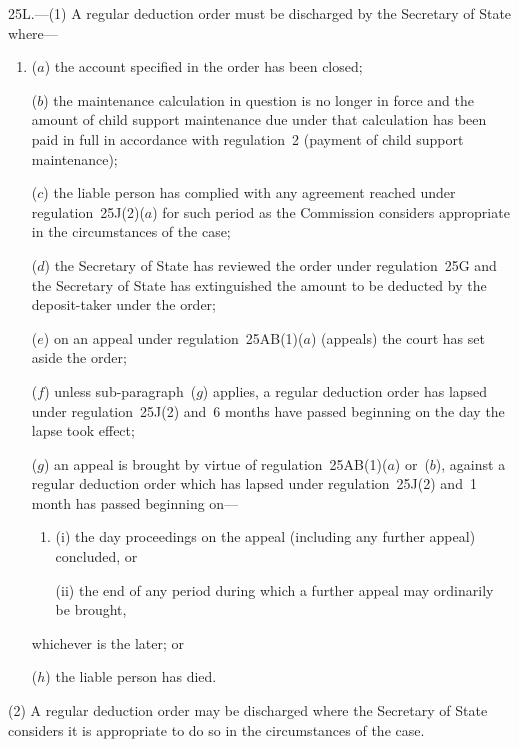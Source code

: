 \documentclass[12pt,a4paper]{article}
\begin{document}
25L.---(1)  A regular deduction order must be discharged by the 
Secretary of State  %
where—
\begin{enumerate}\item[]
($a$) the account specified in the order has been closed;

($b$) the maintenance calculation in question is no longer in force and the amount of child support maintenance due under that calculation has been paid in full in accordance with regulation~2 (payment of child support maintenance);

($c$) the liable person has complied with any agreement reached under regulation~25J(2)($a$)  for such period as the Commission considers appropriate in the circumstances of the case;

($d$) the 
Secretary of State  %
has reviewed the order under regulation~25G and 
the Secretary of State  %
has extinguished the amount to be deducted by the deposit-taker under the order;

($e$) on an appeal under regulation~25AB(1)($a$)  (appeals) the court has set aside the order;

($f$) unless sub-paragraph~($g$)  applies, a regular deduction order has lapsed under regulation~25J(2) and~6 months have passed beginning on the day the lapse took effect;

\begin{sloppypar}
($g$) an appeal is brought by virtue of regulation~25AB(1)($a$)  or~($b$), against a regular deduction order which has lapsed under regulation~25J(2) and~1 month has passed beginning on—
\end{sloppypar}
\begin{enumerate}\item[]
(i) the day proceedings on the appeal (including any further appeal) concluded, or

(ii) the end of any period during which a further appeal may ordinarily be brought,
\end{enumerate}
whichever is the later; or

($h$) the liable person has died.
\end{enumerate}

(2) A regular deduction order may be discharged where the 
Secretary of State  %
considers it is appropriate to do so in the circumstances of the case.
\end{document}

